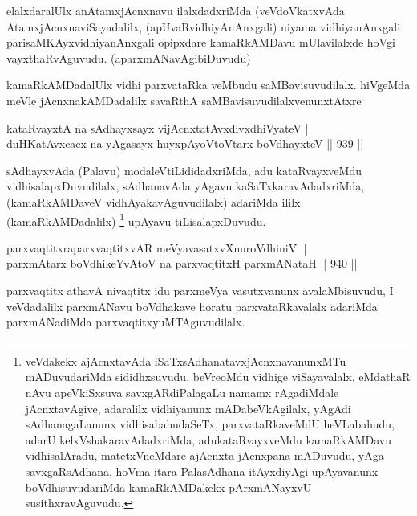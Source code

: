 \begin{artha}
elalxdaralUlx anAtamxjAcnxnavu ilalxdadxriMda (veVdoVkatxvAda AtamxjAcnxnaviSayadalilx, (apUvaRvidhiyAnAnxgali) niyama vidhiyanAnxgali parisaMKAyxvidhiyanAnxgali opipxdare kamaRkAMDavu mUlavilalxde hoVgi vayxthaRvAguvudu. (aparxmANavAgibiDuvudu)
\end{artha}

\begin{artha}
kamaRkAMDadalUlx vidhi parxvataRka veMbudu saMBavisuvudilalx. hiVgeMda meVle jAcnxnakAMDadalilx savaRthA saMBavisuvudilalxvenunxtAtxre\ndash 
\end{artha}

\begin{shl}
kataRvayxtA na sAdhayxsayx vijAcnxtatAvxdivxdhiVyateV || \\
duHKatAvxcacx na yAgasayx huyxpAyoV\s toV\s tarx boVdhayxteV \hfill || 939 ||  
\end{shl}

\begin{artha}
sAdhayxvAda (Palavu) modaleVtiLididadxriMda, adu kataRvayxveMdu vidhisalapxDuvudilalx, sAdhanavAda yAgavu kaSaTxkaravAdadxriMda,(kamaRkAMDaveV vidhAyakavAguvudilalx) adariMda ililx (kamaRkAMDadalilx) \footnote{veVdakekx ajAcnxtavAda iSaTxsAdhanatavxjAcnxnavanunxMTu mADuvudariMda sididhxsuvudu, beVreoMdu vidhige viSayavalalx, eMdathaR nAvu apeVkiSxsuva savxgARdiPalagaLu namamx rAgadiMdale jAcnxtavAgive, adaralilx vidhiyanunx mADabeVkAgilalx, yAgAdi sAdhanagaLanunx vidhisabahudaSeTx, parxvataRkaveMdU heVLabahudu, adarU kelxVshakaravAdadxriMda, adukataRvayxveMdu kamaRkAMDavu vidhisalAradu, matetxVneMdare ajAcnxta jAcnxpana mADuvudu, yAga savxgaRsAdhana, hoVma itara PalasAdhana itAyxdiyAgi upAyavanunx boVdhisuvudariMda kamaRkAMDakekx pArxmANayxvU susithxravAguvudu.} upAyavu tiLisalapxDuvudu.
\end{artha}


\begin{shl}
parxvaqtitxraparxvaqtitxvAR meVyavasatxvXnuroVdhiniV || \\
parxmA\s tarx boVdhikeYvAtoV na parxvaqtitxH parxmANataH \hfill || 940 ||  
\end{shl}

\begin{artha}
parxvaqtitx athavA nivaqtitx idu parxmeVya vasutxvanunx avalaMbisuvudu, I veVdadalilx parxmANavu boVdhakave horatu parxvataRkavalalx adariMda parxmANadiMda parxvaqtitxyuMTAguvudilalx.
\end{artha}

